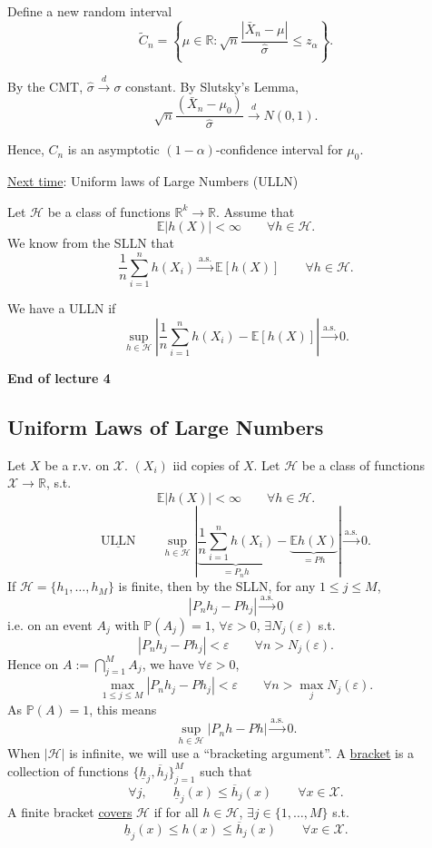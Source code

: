 \documentclass[11pt,a4paper]{article}
\begin{document}
\medskip
\noindent
Define a new random interval
\[
\widetilde{C}_n
=
\left\{
\mu\in\mathbb{R}:
\sqrt{n}\frac{|\bar{X}_n-\mu|}{\hat{\sigma}}
\leq z_\alpha
\right\}.
\]

\noindent
By the CMT, $\hat{\sigma}\xrightarrow{d}\sigma$ constant.
By Slutsky's Lemma,
\[
\sqrt{n}\frac{(\bar{X}_n-\mu_0)}{\hat{\sigma}}
\xrightarrow{d}N(0,1).
\]

\noindent
Hence, $C_n$ is an asymptotic $(1-\alpha)$-confidence interval
for $\mu_0$.

\medskip
\noindent
\underline{Next time}: Uniform laws of Large Numbers (ULLN)

\medskip
\noindent
Let $\mathcal{H}$ be a class of functions
$\mathbb{R}^k\to\mathbb{R}$.
Assume that
\[
\mathbb{E}|h(X)|<\infty
\qquad \forall h\in\mathcal{H}.
\]
We know from the SLLN that
\[
\frac{1}{n}\sum_{i=1}^n h(X_i)
\xrightarrow{\mathrm{a.s.}}
\mathbb{E}[h(X)]
\qquad \forall h\in\mathcal{H}.
\]

\noindent
We have a ULLN if
\[
\sup_{h\in\mathcal{H}}
\left|
\frac{1}{n}\sum_{i=1}^n h(X_i)-\mathbb{E}[h(X)]
\right|
\xrightarrow{\mathrm{a.s.}}0.
\]

\begin{center}
\textbf{End of lecture 4}
\end{center}

\subsection*{Uniform Laws of Large Numbers}

Let $X$ be a r.v. on $\mathcal{X}$. $(X_i)$ iid copies of $X$.
Let $\mathcal{H}$ be a class of functions $\mathcal{X}\to\mathbb{R}$, s.t.
\[
\mathbb{E}|h(X)|<\infty\qquad\forall h\in\mathcal{H}.
\]
\[
\underline{\mathrm{ULLN}}\qquad
\sup_{h\in\mathcal{H}}\left|
\underbrace{\frac{1}{n}\sum_{i=1}^n h(X_i)}_{=P_nh}
-\underbrace{\mathbb{E}h(X)}_{=Ph}\right|
\xrightarrow{\mathrm{a.s.}}0.
\]
If $\mathcal{H}=\{h_1,\ldots,h_M\}$ is finite, then by the SLLN,
for any $1\leq j\leq M$,
\[
|P_nh_j-Ph_j|\xrightarrow{\mathrm{a.s.}}0
\]
i.e. on an event $A_j$ with $\mathbb{P}(A_j)=1$, $\forall\varepsilon>0$,
$\exists N_j(\varepsilon)$ s.t.
\[
|P_nh_j-Ph_j|<\varepsilon\qquad\forall n>N_j(\varepsilon).
\]
Hence on $A:=\bigcap_{j=1}^M A_j$, we have $\forall\varepsilon>0$,
\[
\max_{1\leq j\leq M}|P_nh_j-Ph_j|<\varepsilon
\qquad\forall n>\max_j N_j(\varepsilon).
\]
As $\mathbb{P}(A)=1$, this means
\[
\sup_{h\in\mathcal{H}}|P_nh-Ph|\xrightarrow{\mathrm{a.s.}}0.
\]
When $|\mathcal{H}|$ is infinite, we will use a ``bracketing argument''.
A \underline{bracket} is a collection of functions
$\{\underline{h}_j,\overline{h}_j\}_{j=1}^M$ such that
\[
\forall j,\qquad\underline{h}_j(x)\leq\overline{h}_j(x)
\qquad\forall x\in\mathcal{X}.
\]
A finite bracket \underline{covers} $\mathcal{H}$ if for all $h\in\mathcal{H}$,
$\exists j\in\{1,\ldots,M\}$ s.t.
\[
\underline{h}_j(x)\leq h(x)\leq\overline{h}_j(x)
\qquad\forall x\in\mathcal{X}.
\]
\end{document}
